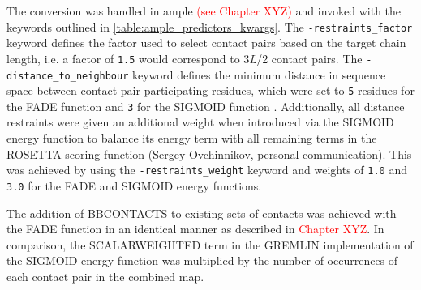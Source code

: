 The conversion was handled in \gls{ample} \textcolor{red}{(see Chapter XYZ)} and invoked with the keywords outlined in \cref{table:ample_predictors_kwargs}. The \texttt{-restraints\_factor} keyword defines the factor used to select contact pairs based on the target chain length, i.e. a factor of \texttt{1.5} would correspond to 3\textit{L}/2 contact pairs. The \texttt{-distance\_to\_neighbour} keyword defines the minimum distance in sequence space between contact pair participating residues, which were set to \texttt{5} residues for the FADE function \cite{Michel2014-ci} and \texttt{3} for the SIGMOID function \cite{Ovchinnikov2015-nt}. Additionally, all distance restraints were given an additional weight when introduced via the SIGMOID energy function to balance its energy term with all remaining terms in the ROSETTA scoring function (Sergey Ovchinnikov, personal communication). This was achieved by using the \texttt{-restraints\_weight} keyword and weights of \texttt{1.0} and \texttt{3.0} for the FADE and SIGMOID energy functions.

The addition of BBCONTACTS to existing sets of contacts was achieved with the FADE function in an identical manner as described in \textcolor{red}{Chapter XYZ}. In comparison, the SCALARWEIGHTED term in the GREMLIN implementation of the SIGMOID energy function \cite{Ovchinnikov2015-nt} was multiplied by the number of occurrences of each contact pair in the combined map.

